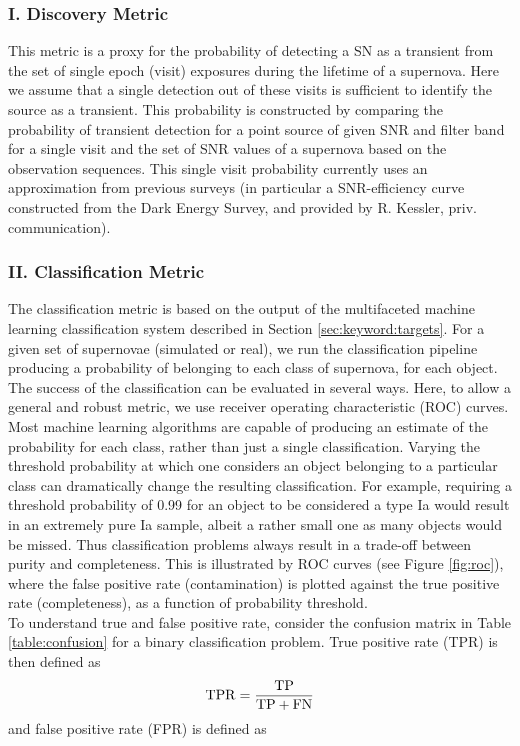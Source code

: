 \subsubsection{I. Discovery Metric}
This metric is a proxy for the probability of detecting a SN as a transient
from the set of single epoch (visit) exposures during the lifetime of a supernova. Here we
assume that a single detection out of these visits is sufficient to identify the source as
a transient. This probability is constructed by comparing the probability of transient
detection for a point source of given SNR and filter band for a single visit and the set of SNR values of a supernova based on the observation sequences. 
This single
visit probability currently uses an approximation from previous surveys (in particular a SNR-efficiency curve constructed from the Dark Energy Survey, and
provided by R. Kessler, priv. communication).

\subsubsection{II. Classification Metric}
The classification metric is based on the output of the multifaceted machine learning 
classification system described in Section \ref{sec:keyword:targets}. For a given set of supernovae 
(simulated or real), we run the classification pipeline producing a probability of belonging to 
each class of supernova, for each object. The success of the classification can be evaluated in 
several ways. Here, to allow a general and robust metric, we use receiver 
operating characteristic (ROC) curves.\\
Most machine learning algorithms are capable of producing an estimate of the probability for each 
class, rather than just a single classification. Varying the threshold probability at which one 
considers an object belonging to a particular class can dramatically change the 
resulting classification. For example, requiring a threshold probability of 0.99 for an object to 
be considered a type Ia would result in an extremely pure Ia sample, albeit a rather small one as 
many objects would be missed. Thus classification problems always result in a trade-off between 
purity and completeness. This is illustrated by ROC curves (see Figure \ref{fig:roc}), where the 
false positive rate (contamination) is plotted against the true positive rate (completeness), as a 
function of probability threshold.\\
To understand true and false positive rate, consider the confusion matrix in Table 
\ref{table:confusion} for a binary classification problem. True positive rate (TPR) is then defined 
as
\begin{equation}
 \rm{TPR} = \frac{\rm{TP}}{\rm{TP}+\rm{FN}}
\end{equation}
and false positive rate (FPR) is defined as

